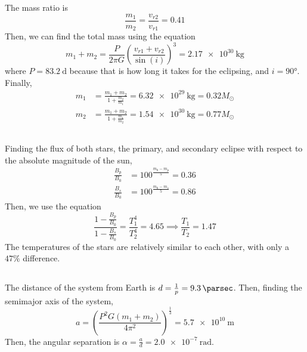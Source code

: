 \documentclass{article}
\begin{document}
The mass ratio is
\begin{equation}
    \frac{m_1}{m_2} = \frac{v_{r2}}{v_{r1}} = \num{0.41}
\end{equation}
Then, we can find the total mass using the equation
\begin{equation}
    m_1 + m_2 = \frac{P}{2 \pi G} \left(\frac{v_{r1} + v_{r2}}{\sin(i)}\right)^3 = \SI{2.17e+30}{\kilogram}
\end{equation}
where \(P = \SI{83.2}{\day}\) because that is how long it takes for the eclipsing, and \(i = \ang{90}\).
Finally,
\begin{align}
    m_1 &= \frac{m_1 + m_2}{1 + \frac{m_2}{m_1}} = \SI{6.32e+29}{\kilogram} = 0.32 M_\odot \\
    m_2 &= \frac{m_1 + m_2}{1 + \frac{m_1}{m_2}} = \SI{1.54e+30}{\kilogram} = 0.77 M_\odot
\end{align}

\subsection{}

Finding the flux of both stars, the primary, and secondary eclipse with respect to the absolute magnitude of the sun,
\begin{align}
    \frac{B_p}{B_0} &= 100^{\frac{m_0 - m_p}{5}} = \num{0.36} \\
    \frac{B_s}{B_0} &= 100^{\frac{m_0 - m_s}{5}} = \num{0.86}
\end{align}
Then, we use the equation
\begin{equation}
    \frac{1 - \frac{B_p}{B_0}}{1 - \frac{B_s}{B_0}} = \frac{T_1^4}{T_2^4} = \num{4.65} \implies \frac{T_1}{T_2} = \num{1.47}
\end{equation}
The temperatures of the stars are relatively similar to each other, with only a \(47\%\) difference.

\subsection{}

The distance of the system from Earth is \(d = \frac{1}{p} = \SI{9.3}{\parsec}\).
Then, finding the semimajor axis of the system,
\begin{equation}
    a = \left(\frac{P^2 G (m_1 + m_2)}{4 \pi^2}\right)^{\frac{1}{3}} = \SI{5.7e+10}{\meter}
\end{equation}
Then, the angular separation is \(\alpha = \frac{a}{d} = \SI{2.0e-7}{\radian}\).
\end{document}
